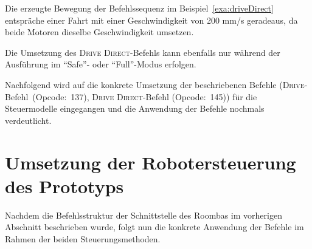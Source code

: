 Die erzeugte Bewegung der Befehlssequenz im Beispiel~\ref{exa:driveDirect} entspräche einer Fahrt mit einer Geschwindigkeit von 200 mm/s geradeaus, da beide Motoren dieselbe Geschwindigkeit umsetzen.

Die Umsetzung des \textsc{Drive} \textsc{Direct}-Befehls kann ebenfalls nur während der Ausführung im \enquote{Safe}- oder \enquote{Full}-Modus erfolgen. 

Nachfolgend wird auf die konkrete Umsetzung der beschriebenen Befehle (\textsc{Drive}-Befehl~(Opcode:~137), \textsc{Drive} \textsc{Direct}-Befehl (Opcode:~145)) für die Steuermodelle eingegangen und die Anwendung der Befehle nochmals verdeutlicht.

\section{Umsetzung der Robotersteuerung des Prototyps}
\label{subsection:robotsteuerung}
Nachdem die Befehlsstruktur der Schnittstelle des Roombas im vorherigen Abschnitt beschrieben wurde, folgt nun die konkrete Anwendung der Befehle im Rahmen der beiden Steuerungsmethoden. 

